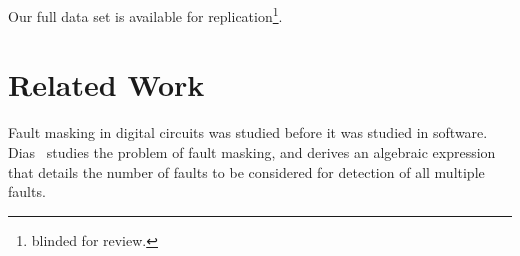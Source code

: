 \documentclass[preprint,nonatbib]{sigplanconf}\usepackage[]{graphicx}\usepackage[]{color}
\begin{document}
\begin{comment}
The \efaultT also has an immediate application. We
have shown previously~\cite{gopinath2015howhard} how sampling can be used to
determine to any required precision whether a given mutant is equivalent or
not. However, the suggested method of evaluating each possibly equivalent
mutant for the full input \finput is still computationally expensive. We suggest
that all possible equivalent mutants for a particular function be combined into
a complex mutant, and evaluated on the input \finput first. If it passes all
given tests, we take all the individual mutations to be equivalent\footnote{It is
possible that they are not. However, the variants~\cite{gopinath2016measuring} produced are likely to
be very similar --- it is a compromise between accuracy and speed.}. If it
fails, split the changes equally to two parts, and recurse. Any time a set of
mutations do not fail for the given test data, the constituent mutations can be
eliminated as possibly equivalent. If a complex mutant is detected, we recurse on its
two halves until we reach the leaves. Since this is a binary tree, the worst
performance may happen when there are at least 50\% non-equivalent mutants,
where we may have to evaluate up to $2\times n$ mutants where $n$ is the total number
of mutants we need to check for equivalence.

Note that we only sample the higher order faults for validation. However, as
we showed previously~\cite{gopinath2015howhard}, sampling is a reasonable
approach as far as mutation analysis is concerned.
\end{comment}

Our full data set is available for replication\footnote{
  blinded for review.
}.


\section{Related Work}
\label{sec:related}

Fault masking in digital circuits was studied before it was studied in
software. Dias~\cite{dias1975fault} studies the problem of fault masking, and
derives an algebraic expression that details the number of faults to be
considered for detection of all multiple faults.
\end{document}
